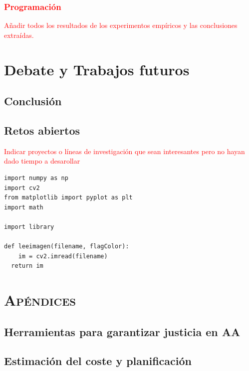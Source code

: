\documentclass[oneside,openright,titlepage,numbers=noenddot,openany,headinclude,footinclude=true,
cleardoublepage=empty,abstractoff,BCOR=5mm,paper=a4,fontsize=12pt,main=spanish]{scrreprt}
\begin{document}
\section{\textcolor{red}{Programación}}

\textcolor{red}{Añadir todos los resultados de los experimentos empíricos y las conclusiones extraídas.}


\part{Debate y Trabajos futuros} \label{part:debate_fut}

\chapter{Conclusión}

\chapter{Retos abiertos}

\textcolor{red}{Indicar proyectos o líneas de investigación que sean interesantes pero no hayan dado tiempo a desarollar}

\begin{verbatim}
import numpy as np
import cv2
from matplotlib import pyplot as plt
import math

import library

def leeimagen(filename, flagColor):
    im = cv2.imread(filename)
  return im
\end{verbatim}



\ctparttext{\color{black}\begin{center}
\end{center}}
\part*{\textsc{Apéndices}}

\appendix
\chapter{Herramientas para garantizar justicia en AA}\label{ap:herr_just}


\chapter{Estimación del coste y planificación}\label{ap:coste_plan}

\end{document}
